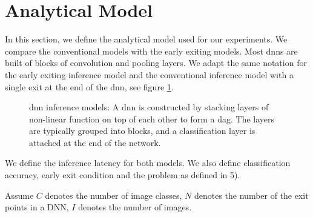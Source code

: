 \newpage\section{Analytical Model} \label{sec:ee-metrics}

In this section, we define the analytical model used for our experiments. We compare the conventional models with the early exiting models. Most \gls{dnn}s are built of blocks of convolution and pooling layers. We adapt the same notation for the early exiting inference model and the conventional inference model with a single exit at the end of the \gls{dnn}, see figure \ref{fig:inference_models}.
\begin{figure}
	\centering
	\captionsetup[subfigure]{justification=centering, farskip=1pt,captionskip=1pt}
	\hfill
	\caption[\gls{dnn} structure]{\gls{dnn} inference models: A \gls{dnn} is constructed by stacking layers of non-linear function on top of each other to form a \gls{dag}. The layers are typically grouped into blocks, and a classification layer is attached at the end of the network.}
	\label{fig:inference_models}
\end{figure}	
We define the inference latency for both models. We also define classification accuracy, early exit condition and the problem as defined in 5). 

Assume $ C $ denotes the number of image classes, $ N $ denotes the number of the exit points in a DNN, $ I $ denotes the number of images.

